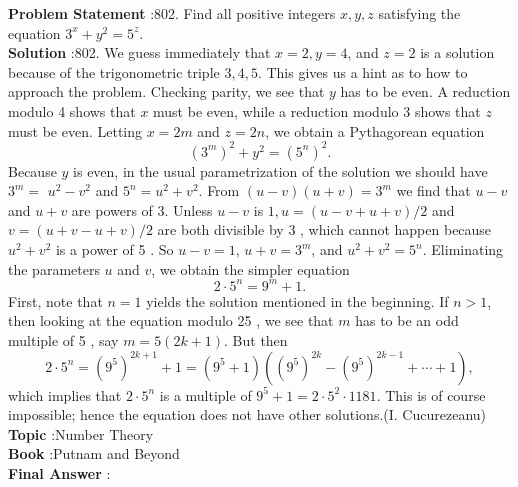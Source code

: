 \documentclass[10pt]{article}
\begin{document}
\textbf{Problem Statement} :802. Find all positive integers $x, y, z$ satisfying the equation $3^{x}+y^{2}=5^{z}$.\\
\textbf{Solution} :802. We guess immediately that $x=2, y=4$, and $z=2$ is a solution because of the trigonometric triple $3,4,5$. This gives us a hint as to how to approach the problem. Checking parity, we see that $y$ has to be even. A reduction modulo 4 shows that $x$ must be even, while a reduction modulo 3 shows that $z$ must be even. Letting $x=2 m$ and $z=2 n$, we obtain a Pythagorean equation$$ \left(3^{m}\right)^{2}+y^{2}=\left(5^{n}\right)^{2} . $$Because $y$ is even, in the usual parametrization of the solution we should have $3^{m}=$ $u^{2}-v^{2}$ and $5^{n}=u^{2}+v^{2}$. From $(u-v)(u+v)=3^{m}$ we find that $u-v$ and $u+v$ are powers of 3. Unless $u-v$ is $1, u=(u-v+u+v) / 2$ and $v=(u+v-u+v) / 2$ are both divisible by 3 , which cannot happen because $u^{2}+v^{2}$ is a power of 5 . So $u-v=1$, $u+v=3^{m}$, and $u^{2}+v^{2}=5^{n}$. Eliminating the parameters $u$ and $v$, we obtain the simpler equation$$ 2 \cdot 5^{n}=9^{m}+1 . $$First, note that $n=1$ yields the solution mentioned in the beginning. If $n>1$, then looking at the equation modulo 25 , we see that $m$ has to be an odd multiple of 5 , say $m=5(2 k+1)$. But then$$ 2 \cdot 5^{n}=\left(9^{5}\right)^{2 k+1}+1=\left(9^{5}+1\right)\left(\left(9^{5}\right)^{2 k}-\left(9^{5}\right)^{2 k-1}+\cdots+1\right), $$which implies that $2 \cdot 5^{n}$ is a multiple of $9^{5}+1=2 \cdot 5^{2} \cdot 1181$. This is of course impossible; hence the equation does not have other solutions.(I. Cucurezeanu) \\
\textbf{Topic} :Number Theory\\
\textbf{Book} :Putnam and Beyond\\
\textbf{Final Answer} :\\
\end{document}
